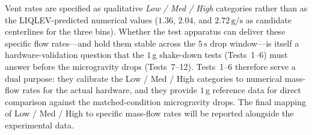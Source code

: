 \documentclass[conf]{new-aiaa}
\begin{document}
Vent rates are specified as qualitative \emph{Low / Med / High} categories rather than as the LIQLEV-predicted numerical values ($1.36$, $2.04$, and $2.72\,\text{g/s}$ as candidate centerlines for the three bins). Whether the test apparatus can deliver these specific flow rates---and hold them stable across the $5\,\text{s}$ drop window---is itself a hardware-validation question that the $1\,$g shake-down tests (Tests~1--6) must answer before the microgravity drops (Tests~7--12). Tests~1--6 therefore serve a dual purpose: they calibrate the Low / Med / High categories to numerical mass-flow rates for the actual hardware, and they provide $1\,$g reference data for direct comparison against the matched-condition microgravity drops. The final mapping of Low / Med / High to specific mass-flow rates will be reported alongside the experimental data.

\begin{table}[!htbp]
\centering
\caption{Sample test matrix for the NASA GRC 5-second zero-gravity facility. Test article: $91\,\text{mm}$ ($0.3\,\text{ft}$) diameter $\times$ $0.61\,\text{m}$ ($2.0\,\text{ft}$) height tank, working fluids LN$_2$/GN$_2$. Vent-rate categories (Low / Med / High) are calibrated to numerical mass-flow rates by the $1\,$g shake-down drops (Tests~1--6); LIQLEV-predicted target rates for these categories are $\sim 1.36$, $\sim 2.04$, and $\sim 2.72\,\text{g/s}$ ($\sim 0.003$, $\sim 0.0045$, $\sim 0.006\,\text{lbm/s}$). All tests performed $2\times$ for repeatability assessment ($\sim 18$ drops total).}
\label{tab:recommended_test_matrix}
\end{table}
\end{document}
